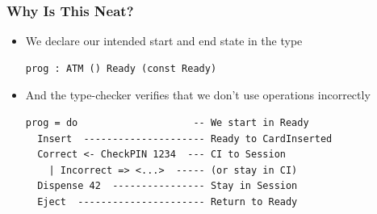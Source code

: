 \documentclass[compress]{beamer}
\begin{document}
\begin{frame}[fragile]
  \frametitle{Why Is This Neat?}

  \large

  \begin{itemize}
    \item<1-> We declare our intended start and end state in the type
              \begin{verbatim}
prog : ATM () Ready (const Ready)
              \end{verbatim}
    \item<2-> And the type-checker verifies that we don't use operations
              incorrectly
              \begin{verbatim}
prog = do                    -- We start in Ready
  Insert  --------------------- Ready to CardInserted
  Correct <- CheckPIN 1234  --- CI to Session
    | Incorrect => <...>  ----- (or stay in CI)
  Dispense 42  ---------------- Stay in Session
  Eject  ---------------------- Return to Ready
              \end{verbatim}
  \end{itemize}

\end{frame}
\end{document}

